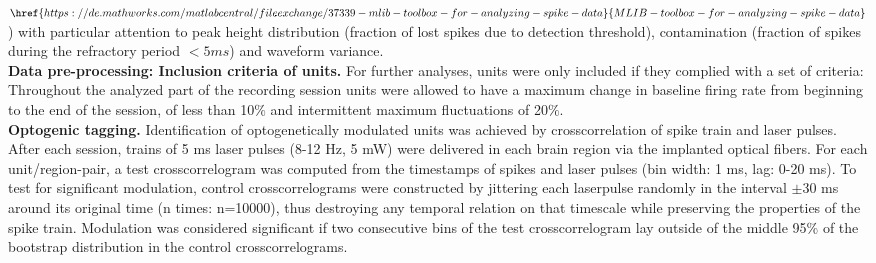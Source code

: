\begin{framed}
$\href{https://de.mathworks.com/matlabcentral/fileexchange/37339-mlib-toolbox-for-analyzing-spike-data}{MLIB-toolbox-for-analyzing-spike-data}$) with particular attention to peak height distribution (fraction of lost spikes due to detection threshold), contamination (fraction of spikes during the refractory period $<5ms$) and waveform variance.\\\textbf{Data pre-processing: Inclusion criteria of units.} For further analyses, units were only included if they complied with a set of criteria: Throughout the analyzed part of the recording session units were allowed to have a maximum change in baseline firing rate from beginning to the end of the session, of less than 10$\%$ and intermittent maximum fluctuations of 20$\%$.\\\textbf{Optogenic tagging.} Identification of optogenetically modulated units was achieved by crosscorrelation of spike train and laser pulses.\\After each session, trains of 5 ms laser pulses (8-12 Hz, 5 mW) were delivered in each brain region via the implanted optical fibers. For each unit/region-pair, a test crosscorrelogram was computed from the timestamps of spikes and laser pulses (bin width: 1 ms, lag:  0-20 ms). To test for significant modulation, control crosscorrelograms were constructed by jittering each laserpulse randomly in the interval $\pm$30 ms around its original time (n times: n=10000), thus destroying any temporal relation on that timescale while preserving the properties of the spike train. Modulation was considered significant if two consecutive bins of the test crosscorrelogram lay outside of the middle 95$\%$ of the bootstrap distribution in the control crosscorrelograms. 
\end{framed}